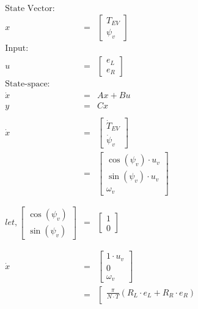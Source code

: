 \documentclass[12pt]{article}
\begin{document}
	\begin{eqnarray}
	\text{State Vector:}&& \nonumber\\
	x &=& \left[
	\begin{array}{c}
	T_{EV}\\
	\psi_v 
	\end{array}
	\right]\\
	\text{Input:}&& \nonumber \\
	u &=& \left[
	\begin{array}{c}
	e_L\\
	e_R 
	\end{array}
	\right]\\
	\text{State-space:}&& \nonumber\\
	\dot{x} &=& Ax+Bu\\
	y &=& Cx\\
	\nonumber \\
	\dot{x} &=& \left[
	\begin{array}{c}
	\dot{T}_{EV}\\
	\dot{\psi}_v 
	\end{array}
	\right] \nonumber \\
	&=& \left[
	\begin{array}{c}
	\cos(\psi_v)\cdot u_v\\
	\sin(\psi_v)\cdot u_v\\
	\omega_v 
	\end{array}
	\right] \nonumber\\
	\nonumber \\
	\nonumber \\
	let, \left[
	\begin{array}{c}
	\cos(\psi_v)\\
	\sin(\psi_v) 
	\end{array}
	\right] &=& \left[
	\begin{array}{c}
	1\\
	0
	\end{array}
	\right] \nonumber \\
	\nonumber \\
	\nonumber \\
	\dot{x} &=& \left[
	\begin{array}{c}
	1\cdot u_v\\
	0\\
	\omega_v 
	\end{array}
	\right] \nonumber \\
	&=& \left[
	\begin{array}{c}
	\frac{\pi}{N\cdot T}(R_L\cdot e_L + R_R\cdot e_R)\\

\end{array}
\end{eqnarray}
\end{document}
